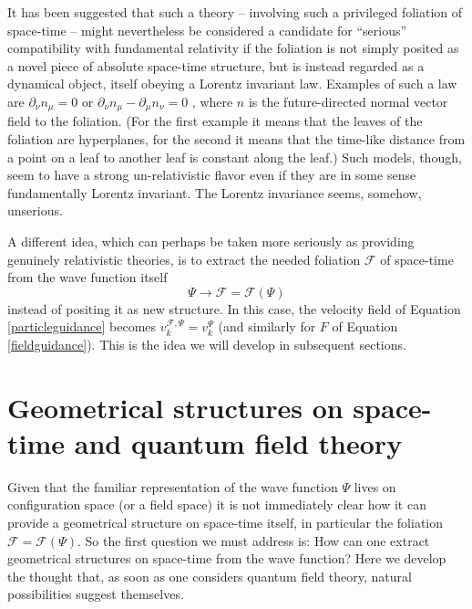 \documentclass[12pt]{article}
\def\pa{\partial}
\begin{document}
It has been 
suggested that such a theory -- involving such a privileged
foliation of space-time -- 
might nevertheless be considered a candidate for ``serious'' compatibility with
fundamental relativity if the foliation is not simply posited as a
novel piece of absolute space-time structure, but is instead regarded
as a dynamical object, itself obeying a Lorentz invariant law. Examples of such a law are $\pa_\nu n_\mu =0$ \cite{duerr99} or $\pa_\nu n_\mu - \pa_\mu n_\nu =0$ \cite{tumulka07}, where $n$ is the future-directed normal vector field to the foliation. (For the first example it means that the leaves of the foliation are hyperplanes, for the second it means that the time-like distance from a point on a leaf to another leaf is constant along the leaf.) Such models, though, seem to have a strong un-relativistic flavor even if they are in some sense fundamentally Lorentz invariant.  The Lorentz invariance seems, somehow, unserious.


A different idea, which can perhaps be taken more seriously as
providing genuinely relativistic theories, is to extract the needed
foliation $\mathscr{F}$ of space-time from the wave function itself 
\begin{equation}
\Psi \rightarrow \mathscr{F} = \mathscr{F}(\Psi)
\end{equation}
instead of positing it as new structure. In this case, the velocity
field of Equation \eqref{particleguidance} becomes $v^{\mathscr{F},
  \Psi{}}_k=v^{ \Psi{}}_k$ (and similarly for $F$ of Equation
\eqref{fieldguidance}).   This is the idea we will 
develop in subsequent sections.



\section{{Geometrical  structures on space-time and quantum  field theory}}
\label{sec3}

Given that the familiar representation of the wave function $\Psi$ 
lives on configuration space (or a field space) 
it is not immediately clear how it can provide a
geometrical structure on space-time itself, in particular the foliation
$\mathscr{F}= \mathscr{F}(\Psi)$.  So the first question we must
address is:  How can one extract geometrical structures on space-time 
from the wave function?
Here we develop the thought that, as soon as one considers quantum
field theory, natural possibilities suggest themselves.
\end{document}

